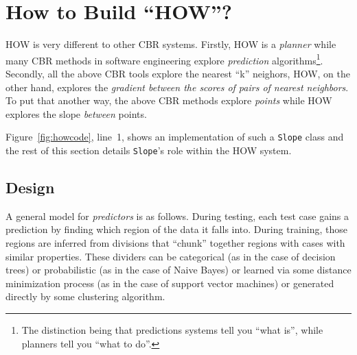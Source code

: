 \documentclass[conference]{IEEEtran}
\newcommand{\fig}[1]{Figure~\ref{fig:#1}}
\begin{document}
\section{How to Build ``HOW''?}\label{sec:mm}

HOW is very different to other CBR systems. Firstly, HOW is a {\em planner} while many
CBR methods in software engineering explore  {\em prediction} algorithms\footnote{The distinction being that
predictions systems tell you ``what is'', while planners tell you ``what to do''.}.
Secondly, all the above CBR tools explore the nearest ``k'' neighors,
HOW, on the other hand, explores the {\em gradient between the scores of pairs of nearest neighbors}. 
To put that another way, the above CBR methods explore {\em points} while
HOW explores the slope {\em between} points.

\fig{howcode}, line~1, shows  an implementation of such a {\tt Slope} class and
the rest
of this section  details   {\tt Slope}'s role within the HOW system.

\subsection{Design}
A general model for {\em predictors} is as follows. 
During testing, each test case gains a prediction 
by finding which region of the data it falls into.
During training, those regions are inferred from
divisions that ``chunk'' together regions with cases
with similar properties. These dividers can be categorical (as in the case of decision trees) or probabilistic (as in the
case of Naive Bayes) or learned via some distance minimization
process 
(as in the case of support vector machines) or generated
directly by some clustering algorithm. 
\end{document}
